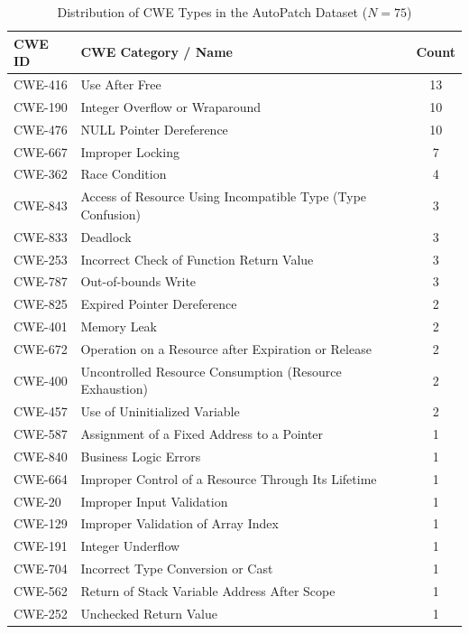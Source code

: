 \begin{table}
\centering
\caption{Distribution of CWE Types in the AutoPatch Dataset ($N = 75$)}
\label{tab:autopatch_cwe_distribution}
\begin{tabular}{llc}
    \toprule
    \textbf{CWE ID} & \textbf{CWE Category / Name} & \textbf{Count} \\
    \midrule
    CWE-416 & Use After Free & 13 \\
    CWE-190 & Integer Overflow or Wraparound & 10 \\
    CWE-476 & NULL Pointer Dereference & 10 \\
    CWE-667 & Improper Locking & 7 \\
    CWE-362 & Race Condition & 4 \\
    CWE-843 & Access of Resource Using Incompatible Type (Type Confusion) & 3 \\
    CWE-833 & Deadlock & 3 \\
    CWE-253 & Incorrect Check of Function Return Value & 3 \\
    CWE-787 & Out-of-bounds Write & 3 \\
    CWE-825 & Expired Pointer Dereference & 2 \\
    CWE-401 & Memory Leak & 2 \\
    CWE-672 & Operation on a Resource after Expiration or Release & 2 \\
    CWE-400 & Uncontrolled Resource Consumption (Resource Exhaustion) & 2 \\
    CWE-457 & Use of Uninitialized Variable & 2 \\
    CWE-587 & Assignment of a Fixed Address to a Pointer & 1 \\
    CWE-840 & Business Logic Errors & 1 \\
    CWE-664 & Improper Control of a Resource Through Its Lifetime & 1 \\
    CWE-20  & Improper Input Validation & 1 \\
    CWE-129 & Improper Validation of Array Index & 1 \\
    CWE-191 & Integer Underflow & 1 \\
    CWE-704 & Incorrect Type Conversion or Cast & 1 \\
    CWE-562 & Return of Stack Variable Address After Scope & 1 \\
    CWE-252 & Unchecked Return Value & 1 \\
    \bottomrule
\end{tabular}
\end{table}


